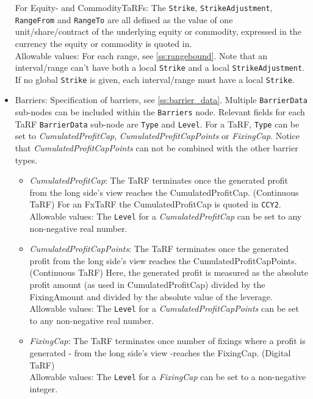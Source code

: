 \begin{itemize}
For Equity- and CommodityTaRFs: The \lstinline!Strike!, \lstinline!StrikeAdjustment!, \lstinline!RangeFrom! and \lstinline!RangeTo!  are all defined as the value of one
unit/share/contract of the underlying equity or commodity, expressed in the currency the equity or commodity is quoted in. \\
    
Allowable values: For each range, see \ref{ss:rangebound}. Note that an interval/range can't have both a local \lstinline!Strike!  and a local \lstinline!StrikeAdjustment!. If no global \lstinline!Strike! is given, each interval/range must have a local \lstinline!Strike!.

    \item Barriers: Specification of barriers, see \ref{ss:barrier_data}. Multiple \lstinline!BarrierData! sub-nodes can be included within the \lstinline!Barriers! node. Relevant fields for each TaRF \lstinline!BarrierData! sub-node are \lstinline!Type! and \lstinline!Level!.  For a TaRF, \lstinline!Type! can be set to \emph{CumulatedProfitCap}, \emph{CumulatedProfitCapPoints} or \emph{FixingCap}. Notice that \emph{CumulatedProfitCapPoints} can not be combined with the other barrier types.
    
    \begin{itemize}
    \item \emph{CumulatedProfitCap}: The TaRF terminates once the generated profit from the long side's view reaches the
      CumulatedProfitCap. (Continuous TaRF) For an FxTaRF the CumulatedProfitCap is quoted in
      \lstinline!CCY2!. \\ Allowable values: The \lstinline!Level! for a \emph{CumulatedProfitCap} can be set to any
      non-negative real number.

    \item \emph{CumulatedProfitCapPoints}: The TaRF terminates once the generated profit from the long side's view
      reaches the CumulatedProfitCapPoints. (Continuous TaRF) Here, the generated profit is measured as the absolute
      profit amount (as used in CumulatedProfitCap) divided by the FixingAmount and divided by the absolute value of the
      leverage. \\ Allowable values: The \lstinline!Level! for a \emph{CumulatedProfitCapPoints} can be set to any
      non-negative real number.

    \item \emph{FixingCap}: The TaRF terminates once number of fixings where a profit is generated - from the long side's view -reaches the FixingCap. (Digital TaRF)\\
     Allowable values: The \lstinline!Level! for a \emph{FixingCap} can be set to a non-negative integer.
    \end{itemize}

\end{itemize}

